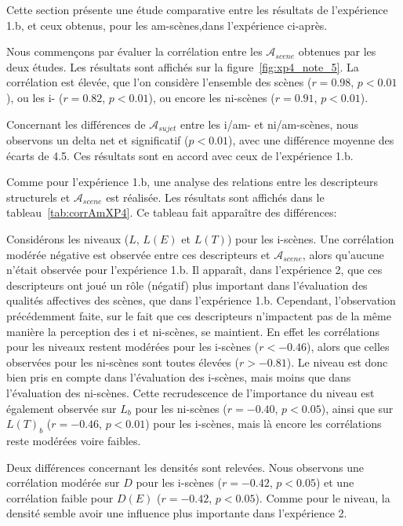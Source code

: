 Cette section présente une étude comparative entre les résultats de l'expérience 1.b, et ceux obtenus, pour les am-scènes,dans l'expérience ci-après. 

Nous commençons par évaluer la corrélation entre les $\mathcal{A}_{scene}$ obtenues par les deux études. Les résultats sont affichés sur la figure~\ref{fig:xp4_note_5}. La corrélation est élevée, que l'on considère l'ensemble des scènes ($r=0.98$, $p<0.01$), ou les i- ($r=0.82$, $p<0.01$), ou encore les ni-scènes  ($r=0.91$, $p<0.01$).

Concernant les différences de $\mathcal{A}_{sujet}$ entre les i/am- et ni/am-scènes, nous observons un delta net et significatif ($p<0.01$), avec une différence moyenne des écarts de 4.5. Ces résultats sont en accord avec ceux de l'expérience 1.b.

Comme pour l'expérience 1.b, une analyse des relations entre les descripteurs structurels et $\mathcal{A}_{scene}$ est réalisée. Les résultats sont affichés dans le tableau~\ref{tab:corrAmXP4}. Ce tableau fait apparaître des différences: 

Considérons les niveaux ($L$, $L(E)$ et $L(T)$) pour les i-scènes. Une corrélation modérée négative est observée entre ces descripteurs et $\mathcal{A}_{scene}$, alors qu'aucune n'était observée pour l'expérience 1.b. Il apparaît, dans l'expérience 2, que ces descripteurs ont joué un rôle (négatif) plus important dans l'évaluation des qualités affectives des scènes, que dans l'expérience 1.b. Cependant, l'observation précédemment faite, sur le fait que ces descripteurs n'impactent pas de la même manière la perception des i et ni-scènes, se maintient. En effet les corrélations pour les niveaux restent modérées pour les i-scènes ($r<-0.46$), alors que celles observées pour les ni-scènes sont toutes élevées ($r>-0.81$). Le niveau est donc bien pris en compte dans l'évaluation des i-scènes, mais moins que dans l'évaluation des ni-scènes. Cette recrudescence de l'importance du niveau est également observée sur $L_b$ pour les ni-scènes ($r=-0.40$, $p<0.05$), ainsi que sur $L(T)_b$ ($r=-0.46$, $p<0.01$) pour les i-scènes, mais là encore les corrélations reste modérées voire faibles.

Deux différences concernant les densités sont relevées. Nous observons une corrélation modérée sur $D$ pour les i-scènes ($r=-0.42$, $p<0.05$) et une corrélation faible pour $D(E)$ ($r=-0.42$, $p<0.05$). Comme pour le niveau, la densité semble avoir une influence plus importante dans l'expérience 2. 

